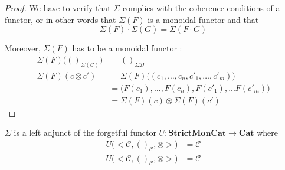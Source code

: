 \documentclass{report}
\begin{document}
\begin{proof}
    We have to verify that $\Sigma$ complies with the coherence conditions of a functor, or in other words that $\Sigma(F)$ is a monoidal functor and that
    $$\Sigma(F) \cdot \Sigma(G) = \Sigma(F\cdot G) $$

    Moreover, $\Sigma(F)$ has to be a monoidal functor :%
    \begin{align*}
        \Sigma(F)\big(()_{\Sigma(\mathcal{C})}\big)
         & = ()_\mathcal{\Sigma{D}}                                   \\
        \Sigma(F)(c\otimes c')
         & = \Sigma(F) \big((c_1, \dots, c_n,c'_1, \dots, c'_m) \big) \\
         & =  \big(F(c_1),\dots,F(c_n),F(c'_1),...F(c'_m)\big)        \\
         & = \Sigma(F)(c) \otimes \Sigma(F)(c')
    \end{align*}
\end{proof}

\begin{prop}
    $\Sigma$ is a left adjunct of the forgetful functor $U : \textbf{StrictMonCat} \rightarrow \textbf{Cat}$ where
    \begin{align*}
        U\big(\big<\mathcal{C},()_{\mathcal{C}},\otimes\big>\big)
         & = \mathcal{C} \\
        U\big(\big<\mathcal{C},()_{\mathcal{C}},\otimes\big>\big)
         & = \mathcal{C} \\
    \end{align*}
\end{prop}
\end{document}

